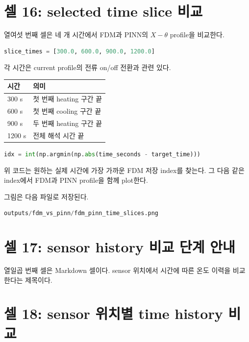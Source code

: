 \documentclass[11pt]{article}
\begin{document}
\section{셀 16: selected time slice 비교}

열여섯 번째 셀은 네 개 시간에서 FDM과 PINN의 \(X-\theta\) profile을 비교한다.

\begin{lstlisting}[language=Python]
slice_times = [300.0, 600.0, 900.0, 1200.0]
\end{lstlisting}

각 시간은 current profile의 전류 on/off 전환과 관련 있다.

\begin{center}
\begin{tabular}{ll}
\toprule
시간 & 의미 \\
\midrule
300 s & 첫 번째 heating 구간 끝 \\
600 s & 첫 번째 cooling 구간 끝 \\
900 s & 두 번째 heating 구간 끝 \\
1200 s & 전체 해석 시간 끝 \\
\bottomrule
\end{tabular}
\end{center}

\begin{lstlisting}[language=Python]
idx = int(np.argmin(np.abs(time_seconds - target_time)))
\end{lstlisting}

위 코드는 원하는 실제 시간에 가장 가까운 FDM 저장 index를 찾는다.
그 다음 같은 index에서 FDM과 PINN profile을 함께 plot한다.

그림은 다음 파일로 저장된다.

\begin{lstlisting}[language=Python]
outputs/fdm_vs_pinn/fdm_pinn_time_slices.png
\end{lstlisting}

\section{셀 17: sensor history 비교 단계 안내}

열일곱 번째 셀은 Markdown 셀이다.
sensor 위치에서 시간에 따른 온도 이력을 비교한다는 제목이다.

\section{셀 18: sensor 위치별 time history 비교}
\end{document}
